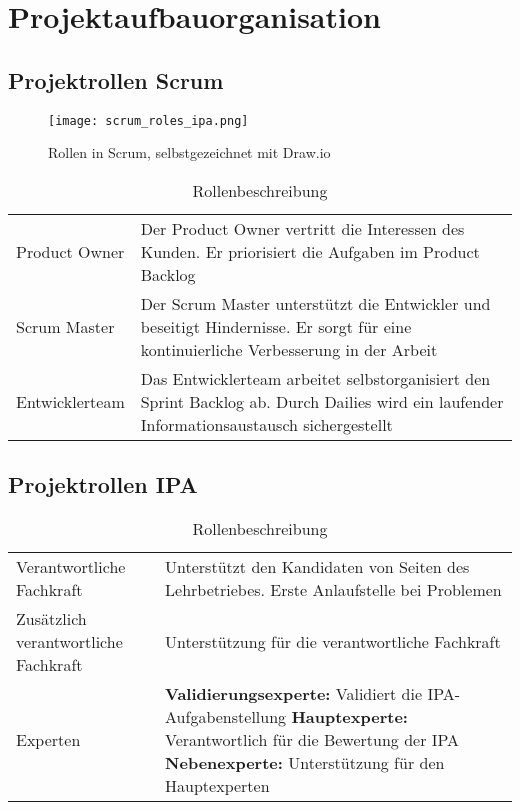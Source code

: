\chapter{Projektaufbauorganisation}

\section{Projektrollen Scrum}

\begin{figure}[h]
    \centering
    \texttt{[image: scrum\_roles\_ipa.png]}
    \caption{Rollen in Scrum, selbstgezeichnet mit Draw.io}
\end{figure}

\begin{table}[h!]
    \begin{tabular}{|L{0.4\textwidth}|L{0.5\textwidth}|}
        \hline
          \\[12pt]
        \hline
        Product Owner & Der Product Owner vertritt die Interessen des Kunden. Er priorisiert die Aufgaben im Product Backlog  \\
        \hline
        Scrum Master & Der Scrum Master unterstützt die Entwickler und beseitigt Hindernisse. Er sorgt für eine 
        kontinuierliche Verbesserung in der Arbeit \\
        \hline
        Entwicklerteam & Das Entwicklerteam arbeitet selbstorganisiert den Sprint Backlog ab. 
        Durch Dailies wird ein laufender Informationsaustausch sichergestellt \\
        \hline
      \end{tabular}
      \caption{Rollenbeschreibung}
\end{table}

\section{Projektrollen IPA}
\begin{table}[h!]
    \begin{tabular}{|L{0.4\textwidth}|L{0.5\textwidth}|}
        \hline
          \\[12pt]
        \hline
        Verantwortliche Fachkraft & Unterstützt den Kandidaten von Seiten des Lehrbetriebes. Erste Anlaufstelle bei Problemen  \\
        \hline
        Zusätzlich verantwortliche Fachkraft & Unterstützung für die verantwortliche Fachkraft \\
        \hline
        Experten & \textbf{Validierungsexperte:} Validiert die IPA-Aufgabenstellung
                    \textbf{Hauptexperte:} Verantwortlich für die Bewertung der IPA
                    \textbf{Nebenexperte:} Unterstützung für den Hauptexperten \\ 
        \hline
      \end{tabular}
      \caption{Rollenbeschreibung}
\end{table}

